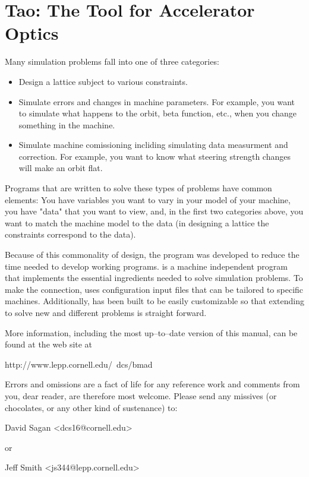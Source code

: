 \section*{Tao: The Tool for Accelerator Optics}

Many simulation problems fall into one of three categories: 

\begin{itemize}
\item 
Design a lattice subject to various constraints.
\item
Simulate errors and changes in machine parameters. For example, you want to
simulate what happens to the orbit, beta function, etc., when you change
something in the machine. 
\item 
Simulate machine comissioning incliding simulating data measurment and
correction. For example, you want to know what steering strength changes will
make an orbit flat.
\end{itemize}
 
Programs that are written to solve these types of problems have common
elements: You have variables you want to vary in your model of your
machine, you have "data" that you want to view, and, in the first two
categories above, you want to match the machine model to the data (in
designing a lattice the constraints correspond to the data).

Because of this commonality of design, the \tao program was developed
to reduce the time needed to develop working programs. \tao is a
machine independent program that implements the essential ingredients
needed to solve simulation problems. To make the connection, \tao uses
configuration input files that can be tailored to specific
machines. Additionally, \tao has been built to be easily customizable
so that extending \tao to solve new and different problems is straight
forward.

More information, including the most up--to--date version of this
manual, can be found at the \bmad web site at
\begin{example}
  http://www.lepp.cornell.edu/~dcs/bmad
\end{example}

Errors and omissions are a fact of life for any reference work and
comments from you, dear reader, are therefore most welcome. Please
send any missives (or chocolates, or any other kind of sustenance) to:
\begin{example}
  David Sagan <dcs16@cornell.edu>
\end{example}
or
\begin{example}
  Jeff Smith <js344@lepp.cornell.edu>
\end{example}
